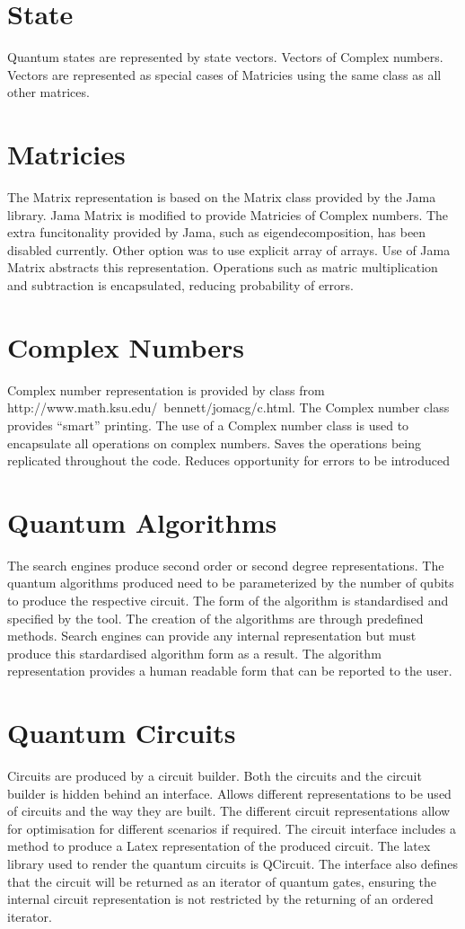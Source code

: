 \documentclass[authoryearcitations]{UoYCSproject}
\begin{document}
\section{State}
Quantum states are represented by state vectors.
Vectors of Complex numbers.
Vectors are represented as special cases of Matricies using the same class as all other matrices.

\section{Matricies}
The Matrix representation is based on the Matrix class provided by the Jama library.
Jama Matrix is modified to provide Matricies of Complex numbers.
The extra funcitonality provided by Jama, such as eigendecomposition, has been disabled currently.
Other option was to use explicit array of arrays.
Use of Jama Matrix abstracts this representation.
Operations such as matric multiplication and subtraction is encapsulated, reducing probability of errors.

\section{Complex Numbers}
Complex number representation is provided by class from http://www.math.ksu.edu/~bennett/jomacg/c.html.
The Complex number class provides ``smart'' printing.
The use of a Complex number class is used to encapsulate all operations on complex numbers.
Saves the operations being replicated throughout the code.
Reduces opportunity for errors to be introduced

\section{Quantum Algorithms}
The search engines produce second order or second degree representations.
The quantum algorithms produced need to be parameterized by the number of qubits to produce the respective circuit.
The form of the algorithm is standardised and specified by the tool.
The creation of the algorithms are through predefined methods.
Search engines can provide any internal representation but must produce this stardardised algorithm form as a result.
The algorithm representation provides a human readable form that can be reported to the user.

\section{Quantum Circuits}
Circuits are produced by a circuit builder.
Both the circuits and the circuit builder is hidden behind an interface.
Allows different representations to be used of circuits and the way they are built.
The different circuit representations allow for optimisation for different scenarios if required.
The circuit interface includes a method to produce a Latex representation of the produced circuit.
The latex library used to render the quantum circuits is QCircuit.
The interface also defines that the circuit will be returned as an iterator of quantum gates, ensuring the internal circuit representation is not restricted by the returning of an ordered iterator.
\end{document}
